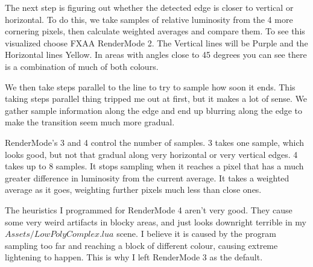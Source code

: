 \documentclass[10pt]{article}
\begin{document}
	The next step is figuring out whether the detected edge is closer to vertical or horizontal. To do this, we take samples of relative luminosity from the 4 more cornering pixels, then calculate weighted averages and compare them. To see this visualized choose FXAA RenderMode 2. The Vertical lines will be Purple and the Horizontal lines Yellow. In areas with angles close to 45 degrees you can see there is a combination of much of both colours.
	
	We then take steps parallel to the line to try to sample how soon it ends. This taking steps parallel thing tripped me out at first, but it makes a lot of sense. We gather sample information along the edge and end up blurring along the edge to make the transition seem much more gradual.
	
	RenderMode's 3 and 4 control the number of samples. 3 takes one sample, which looks good, but not that gradual along very horizontal or very vertical edges. 4 takes up to 8 samples. It stops sampling when it reaches a pixel that has a much greater difference in luminosity from the current average. It takes a weighted average as it goes, weighting further pixels much less than close ones.
	
	The heuristics I programmed for RenderMode 4 aren't very good. They cause some very weird artifacts in blocky areas, and just looks downright terrible in my $Assets/LowPolyComplex.lua$ scene. I believe it is caused by the program sampling too far and reaching a block of different colour, causing extreme lightening to happen. This is why I left RenderMode 3 as the default.
\end{document}
